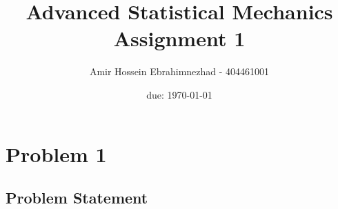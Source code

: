 \documentclass[10pt,twocoloumn]{article}
\title{Advanced Statistical Mechanics Assignment 1}
\author{Amir Hossein Ebrahimnezhad - 404461001}
\date{due: \today}
\begin{document}
\maketitle
\section*{Problem 1}
\subsection*{Problem Statement}
\end{document}
